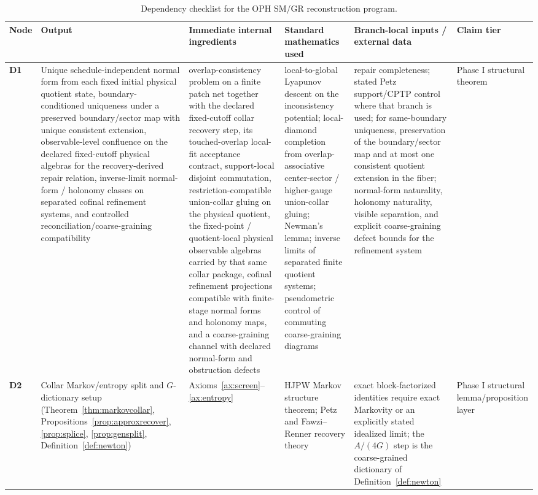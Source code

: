 \documentclass[11pt]{article}
\begin{document}
\begingroup
\tiny
\setlength{\tabcolsep}{1pt}
\begin{longtable}{@{}>{\raggedright\arraybackslash}p{}>{\raggedright\arraybackslash}p{}>{\raggedright\arraybackslash}p{}>{\raggedright\arraybackslash}p{}>{\raggedright\arraybackslash}p{}>{\raggedright\arraybackslash}p{}@{}}
\caption{Dependency checklist for the OPH SM/GR reconstruction program.}\\
\toprule
Node & Output & Immediate internal ingredients & Standard mathematics used & Branch-local inputs / external data & Claim tier \\
\midrule
\endhead
\bottomrule
\endfoot
\textbf{D1} & Unique schedule-independent normal form from each fixed initial physical quotient state, boundary-conditioned uniqueness under a preserved boundary/sector map with unique consistent extension, observable-level confluence on the declared fixed-cutoff physical algebras for the recovery-derived repair relation, inverse-limit normal-form / holonomy classes on separated cofinal refinement systems, and controlled reconciliation/coarse-graining compatibility & overlap-consistency problem on a finite patch net together with the declared fixed-cutoff collar recovery step, its touched-overlap local-fit acceptance contract, support-local disjoint commutation, restriction-compatible union-collar gluing on the physical quotient, the fixed-point / quotient-local physical observable algebras carried by that same collar package, cofinal refinement projections compatible with finite-stage normal forms and holonomy maps, and a coarse-graining channel with declared normal-form and obstruction defects & local-to-global Lyapunov descent on the inconsistency potential; local-diamond completion from overlap-associative center-sector / higher-gauge union-collar gluing; Newman's lemma; inverse limits of separated finite quotient systems; pseudometric control of commuting coarse-graining diagrams & repair completeness; stated Petz support/CPTP control where that branch is used; for same-boundary uniqueness, preservation of the boundary/sector map and at most one consistent quotient extension in the fiber; normal-form naturality, holonomy naturality, visible separation, and explicit coarse-graining defect bounds for the refinement system & Phase I structural theorem \\
\textbf{D2} & Collar Markov/entropy split and \(G\)-dictionary setup (Theorem~\ref{thm:markovcollar}, Propositions~\ref{prop:approxrecover}, \ref{prop:splice}, \ref{prop:gensplit}, Definition~\ref{def:newton}) & Axioms~\ref{ax:screen}--\ref{ax:entropy} & HJPW Markov structure theorem; Petz and Fawzi--Renner recovery theory & exact block-factorized identities require exact Markovity or an explicitly stated idealized limit; the \(A/(4G)\) step is the coarse-grained dictionary of Definition~\ref{def:newton} & Phase I structural lemma/proposition layer \\

\end{longtable}
\end{document}
